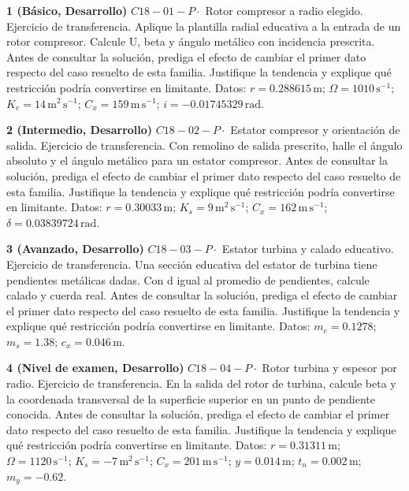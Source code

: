 \documentclass[10pt,openany]{book}
\begin{document}
\begin{tcolorbox}[title={Ejercicios propuestos}, studiumworked, breakable]

\noindent\textbf{1 (Básico, Desarrollo)}
\(C18-01-P \cdot\) Rotor compresor a radio elegido. Ejercicio de transferencia. Aplique la plantilla radial educativa a la entrada de un rotor compresor. Calcule U, beta y ángulo metálico con incidencia prescrita. Antes de consultar la solución, prediga el efecto de cambiar el primer dato respecto del caso resuelto de esta familia. Justifique la tendencia y explique qué restricción podría convertirse en limitante. Datos: \(r=0.288615\, \mathrm{m}\); \(\Omega=1010\, \mathrm{s}^{-1}\); \(K_e=14\, \mathrm{m}^{2}\,\mathrm{s}^{-1}\); \(C_x=159\, \mathrm{m}\,\mathrm{s}^{-1}\); \(i=-0.01745329\, \mathrm{rad}\).

\noindent\textbf{2 (Intermedio, Desarrollo)}
\(C18-02-P \cdot\) Estator compresor y orientación de salida. Ejercicio de transferencia. Con remolino de salida prescrito, halle el ángulo absoluto y el ángulo metálico para un estator compresor. Antes de consultar la solución, prediga el efecto de cambiar el primer dato respecto del caso resuelto de esta familia. Justifique la tendencia y explique qué restricción podría convertirse en limitante. Datos: \(r=0.30033\, \mathrm{m}\); \(K_s=9\, \mathrm{m}^{2}\,\mathrm{s}^{-1}\); \(C_x=162\, \mathrm{m}\,\mathrm{s}^{-1}\); \(\delta=0.03839724\, \mathrm{rad}\).

\noindent\textbf{3 (Avanzado, Desarrollo)}
\(C18-03-P \cdot\) Estator turbina y calado educativo. Ejercicio de transferencia. Una sección educativa del estator de turbina tiene pendientes metálicas dadas. Con d igual al promedio de pendientes, calcule calado y cuerda real. Antes de consultar la solución, prediga el efecto de cambiar el primer dato respecto del caso resuelto de esta familia. Justifique la tendencia y explique qué restricción podría convertirse en limitante. Datos: \(m_e=0.1278\); \(m_s=1.38\); \(c_x=0.046\, \mathrm{m}\).

\noindent\textbf{4 (Nivel de examen, Desarrollo)}
\(C18-04-P \cdot\) Rotor turbina y espesor por radio. Ejercicio de transferencia. En la salida del rotor de turbina, calcule beta y la coordenada transversal de la superficie superior en un punto de pendiente conocida. Antes de consultar la solución, prediga el efecto de cambiar el primer dato respecto del caso resuelto de esta familia. Justifique la tendencia y explique qué restricción podría convertirse en limitante. Datos: \(r=0.31311\, \mathrm{m}\); \(\Omega=1120\, \mathrm{s}^{-1}\); \(K_s=-7\, \mathrm{m}^{2}\,\mathrm{s}^{-1}\); \(C_x=201\, \mathrm{m}\,\mathrm{s}^{-1}\); \(y=0.014\, \mathrm{m}\); \(t_n=0.002\, \mathrm{m}\); \(m_y=-0.62\).
\end{tcolorbox}
\end{document}
